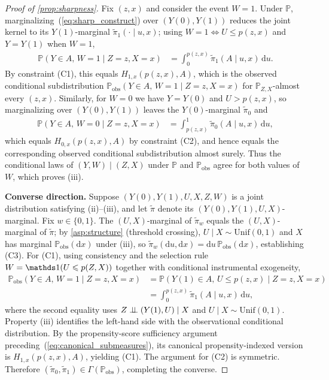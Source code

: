 \begin{proof}[Proof of \cref{prop:sharpness}]
    Fix $(z, x)$ and consider the event $W = 1$. Under $\mathbb{P}$, marginalizing~(\ref{eq:sharp_construct}) over $(Y(0), Y(1))$ reduces the joint kernel to its $Y(1)$-marginal $\tilde{\pi}_1(\cdot \mid u, x)$; using $W = 1 \Leftrightarrow U \leqslant p(z,x)$ and $Y = Y(1)$ when $W = 1$,
    \begin{align*}
        \mathbb{P}(Y \in A, \, W = 1 \mid Z = z, X = x)
        &= \int_0^{p(z,x)} \tilde{\pi}_1(A \mid u, x) \, \mathrm{d}u.
    \end{align*}
    By constraint (C1), this equals $H_{1,x}(p(z,x),A)$, which is the observed conditional subdistribution $\mathbb{P}_{\text{obs}}(Y \in A, \, W = 1 \mid Z = z, X = x)$ for $\mathbb P_{Z,X}$-almost every $(z,x)$. Similarly, for $W = 0$ we have $Y = Y(0)$ and $U > p(z, x)$, so marginalizing over $(Y(0), Y(1))$ leaves the $Y(0)$-marginal $\tilde{\pi}_0$ and
    \begin{align*}
        \mathbb{P}(Y \in A, \, W = 0 \mid Z = z, X = x)
        &= \int_{p(z,x)}^{1} \tilde{\pi}_0(A \mid u, x) \, \mathrm{d}u,
    \end{align*}
    which equals $H_{0,x}(p(z,x),A)$ by constraint (C2), and hence equals the corresponding observed conditional subdistribution almost surely. Thus the conditional laws of $(Y, W) \mid (Z, X)$ under $\mathbb{P}$ and $\mathbb{P}_{\text{obs}}$ agree for both values of $W$, which proves (iii).

    \medskip
    \noindent\textbf{Converse direction.}
    Suppose $(Y(0), Y(1), U, X, Z, W)$ is a joint distribution satisfying (ii)--(iii), and let $\tilde{\pi}$ denote its $(Y(0), Y(1), U, X)$-marginal. Fix $w \in \{0, 1\}$. The $(U, X)$-marginal of $\tilde{\pi}_w$ equals the $(U, X)$-marginal of $\tilde{\pi}$; by \cref{asp:structure} (threshold crossing), $U \mid X \sim \mathrm{Unif}(0, 1)$ and $X$ has marginal $\mathbb{P}_{\text{obs}}(\mathrm{d}x)$ under (iii), so $\tilde{\pi}_w(\mathrm{d}u, \mathrm{d}x) = \mathrm{d}u \, \mathbb{P}_{\text{obs}}(\mathrm{d}x)$, establishing (C3). For (C1), using consistency and the selection rule $W = \indicator(U \leqslant p(Z, X))$ together with conditional instrumental exogeneity,
    \begin{align*}
        \mathbb{P}_{\text{obs}}(Y \in A, \, W = 1 \mid Z = z, X = x)
        &= \mathbb{P}(Y(1) \in A, \, U \leqslant p(z, x) \mid Z = z, X = x) \\
        &= \int_0^{p(z, x)} \tilde{\pi}_1(A \mid u, x) \, \mathrm{d}u,
    \end{align*}
    where the second equality uses $Z \perp\!\!\!\perp (Y(1), U) \mid X$ and $U \mid X \sim \mathrm{Unif}(0, 1)$. Property (iii) identifies the left-hand side with the observational conditional distribution. By the propensity-score sufficiency argument preceding~(\ref{eq:canonical_submeasures}), its canonical propensity-indexed version is $H_{1,x}(p(z,x),A)$, yielding (C1). The argument for (C2) is symmetric. Therefore $(\tilde{\pi}_0,\tilde{\pi}_1) \in \Gamma(\mathbb{P}_{\text{obs}})$, completing the converse.
\end{proof}

